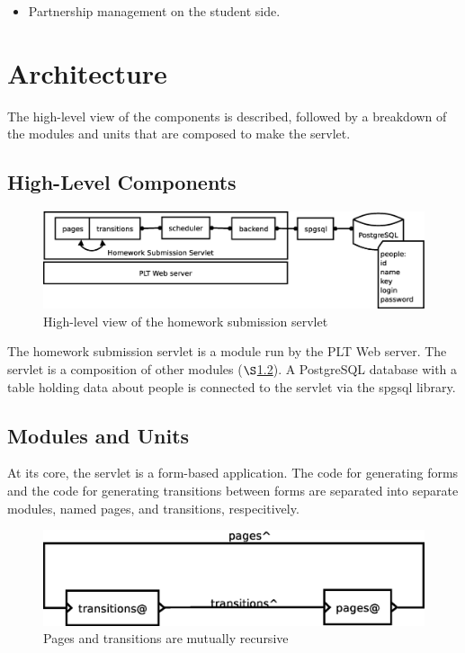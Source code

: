 \documentclass[a4paper]{article}
\begin{document}
\begin{itemize}
\item{Partnership management on the student side.}
\end{itemize}

\section{Architecture}\label{sec:arch}

The high-level view of the components is described, followed by a breakdown of
the modules and units that are composed to make the servlet.

\subsection{High-Level Components}\label{subsec:high-level}

\begin{figure}[ht]
\centering
\includegraphics[scale=.35]{architecture.eps}
\caption{High-level view of the homework submission servlet}
\label{fig:architecture}
\end{figure}

The homework submission servlet is a module run by the PLT Web server. The
servlet is a composition of other modules ($\S$\ref{subsec:components}). A
PostgreSQL database with a table holding data about people is connected to the
servlet via the spgsql library.

\subsection{Modules and Units}\label{subsec:components}

At its core, the servlet is a form-based application. The code for generating 
forms and the code for generating transitions between forms are separated into 
separate modules, named pages, and transitions, respecitively.

\begin{figure}[ht]
\centering
\includegraphics[scale=.30]{units.eps}
\caption{Pages and transitions are mutually recursive}
\label{fig:layout}
\end{figure}
\end{document}
